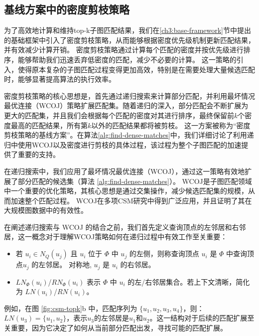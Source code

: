 \subsection{基线方案中的密度剪枝策略}
\label{ch3:wegiht-prune-baseline}
为了高效地计算和维持top-k子图匹配结果，我们在\ref{ch3:base-framework}节中提出的基础框架中引入了密度剪枝策略，从而能够根据密度优先级机制更新匹配结果，并有效减少计算开销。
密度剪枝策略通过计算每个匹配的密度并按优先级进行排序，能够帮助我们迅速丢弃低密度的匹配，减少不必要的计算。
这一策略的引入，使得原本复杂的子图匹配过程变得更加高效，特别是在需要处理大量候选匹配时，能够显著提高算法的执行效率。

密度剪枝策略的核心思想是，首先通过递归搜索来计算部分匹配，并利用最坏情况最优连接（WCOJ）\cite{sm-bfs-DBLP:conf/focs/AtseriasGM08}策略扩展匹配集。随着递归的深入，部分匹配会不断扩展为更大的匹配集，并且我们会根据每个匹配的密度对其进行排序，最终保留前$k$个密度最高的匹配结果，所有第$k$以外的匹配结果都将被剪枝。
这一方案被称为“密度剪枝策略的基线方案”。在算法\ref{alg:find-dense-matches}中，我们详细讨论了利用递归中使用WCOJ以及密度进行剪枝的具体过程，该过程为整个子图匹配的加速提供了重要的支持。

在递归搜索中，我们应用了最坏情况最优连接（WCOJ）\cite{wcoj-generic-join-DBLP:journals/sigmod/NgoRR13}，通过这一策略有效地扩展了部分匹配的候选集（算法 \ref{alg:find-dense-matches}）。
WCOJ是子图匹配领域中一个重要的优化策略，其核心思想是通过交集操作，减少候选匹配集的规模，从而加速整个匹配过程。
WCOJ在多项CSM研究中得到广泛应用\cite{csm-graphflow-DBLP:conf/sigmod/KankanamgeSMCS17,csm-graphflowpp-DBLP:journals/tods/MhedhbiKS21,csm-survey:DBLP:journals/pvldb/SunSLH22}，并且证明了其在大规模图数据中的有效性。

在阐述递归搜索与 WCOJ 的结合之前，我们首先定义查询顶点的左邻居和右邻居，这一概念对于理解WCOJ策略如何在递归过程中有效工作至关重要：
\begin{itemize}
    \item 若 $u_i \in N_Q(u_j)$ 且 $u_i$ 位于 $\Phi$ 中 $u_j$ 的左侧，则称查询顶点 $u_i$ 是 $\Phi$ 中查询顶点$u_j$ 的左邻居。
    对称地, $u_j$ 是 $u_i$ 的右邻居。
    \item $LN_{\Phi}(u_i)$/$RN_{\Phi}(u_i)$ 表示 $\Phi$ 中 $u_i$ 的左/右邻居集合。若上下文清晰，简化为 $LN(u_i)$/$RN(u_i)$。
\end{itemize}   

例如，在图 \ref{fig:csm-topk}b 中，匹配序列为 $\{u_1, u_2, u_3, u_4\}$，则：$LN(u_3) = \{u_1, u_2\}$，表示$u_3$的左邻居是$u_1$和$u_2$。这一结构对于后续的匹配扩展至关重要，因为它决定了如何从当前部分匹配出发，寻找可能的匹配扩展。

